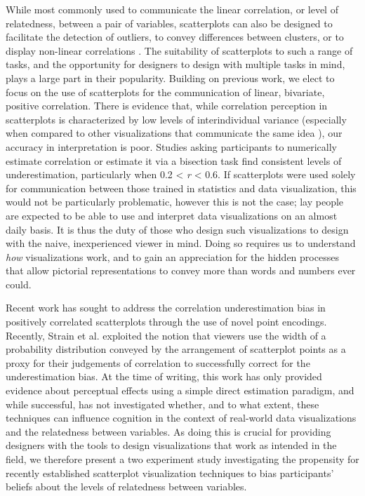 \documentclass[manuscript,screen,review,anonymous]{acmart}
\begin{document}
While most commonly used to communicate the linear correlation, or level
of relatedness, between a pair of variables, scatterplots can also be
designed to facilitate the detection of outliers, to convey differences
between clusters, or to display non-linear correlations
\citep{sarikaya_2018}. The suitability of scatterplots to such a range
of tasks, and the opportunity for designers to design with multiple
tasks in mind, plays a large part in their popularity. Building on
previous work, we elect to focus on the use of scatterplots for the
communication of linear, bivariate, positive correlation. There is
evidence that, while correlation perception in scatterplots is
characterized by low levels of interindividual variance (especially when
compared to other visualizations that communicate the same idea
\citep{harrison_2014, kay_2015}), our accuracy in interpretation is
poor. Studies asking participants to numerically estimate correlation
\citep{strahan_1978, bobko_1979, cleveland_1982, lane_1985, lauer_1989, collyer_1990, meyer_1992}
or estimate it via a bisection task \citep{rensink_2017} find consistent
levels of underestimation, particularly when 0.2 \textless{} \emph{r}
\textless{} 0.6. If scatterplots were used solely for communication
between those trained in statistics and data visualization, this would
not be particularly problematic, however this is not the case; lay
people are expected to be able to use and interpret data visualizations
on an almost daily basis. It is thus the duty of those who design such
visualizations to design with the naive, inexperienced viewer in mind.
Doing so requires us to understand \emph{how} visualizations work, and
to gain an appreciation for the hidden processes that allow pictorial
representations to convey more than words and numbers ever could.

Recent work has sought to address the correlation underestimation bias
in positively correlated scatterplots through the use of novel point
encodings. Recently, Strain et al.
\citep{strain_2023, strain_2023b, strain_2024} exploited the notion that
viewers use the width of a probability distribution conveyed by the
arrangement of scatterplot points as a proxy for their judgements of
correlation to successfully correct for the underestimation bias. At the
time of writing, this work has only provided evidence about perceptual
effects using a simple direct estimation paradigm, and while successful,
has not investigated whether, and to what extent, these techniques can
influence cognition in the context of real-world data visualizations and
the relatedness between variables. As doing this is crucial for
providing designers with the tools to design visualizations that work as
intended in the field, we therefore present a two experiment study
investigating the propensity for recently established scatterplot
visualization techniques to bias participants' beliefs about the levels
of relatedness between variables.
\end{document}
